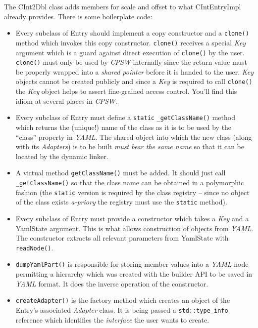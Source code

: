 \documentclass[10pt]{article}
\newcommand{\ita}[1]{\emph{#1}}
\newcommand{\cpsw}      {\ita {CPSW}}
\newcommand{\yaml}      {\ita {YAML}}
\newcommand{\cod}[1] {{\tt#1}}
\begin{document}
The CInt2Dbl class adds members for scale and offset to what CIntEntryImpl
already provides. There is some boilerplate code:
\begin{itemize}
\item Every subclass of Entry should implement a copy constructor and a \cod{clone()}
      method which invokes this copy constructor. \cod{clone()} receives a special
      {\em Key} argument which is a guard against direct execution of \cod{clone()}
      by the user. \cod{clone()} must only be used by \cpsw{} internally since the
      return value must be properly wrapped into a {\em shared pointer} before it
      is handed to the user. {\em Key} objects cannot be created publicly and since
      a {\em Key} is required to call \cod{clone()} the {\em Key} object helps to
      assert fine-grained access control. You'll find this idiom at several places
      in \cpsw{}.
\item Every subclass of Entry must define a \cod{static} \cod{\_getClassName()}
      method which returns the (unique!) name of the class as it is to be used
      by the ``class'' property in \yaml{}. The shared object into which the new
      class (along with its {\em Adapters}) is to be built {\em must bear the same name}
      so that it can be located by the dynamic linker.
\item A virtual method \cod{getClassName()} must be added. It should just 
      call \cod{\_getClassName()} so that the class name can be obtained in a polymorphic
      fashion (the \cod{static} version is required by the class registry -- since
      no object of the class exists {\em a-priory} the registry must use the
      \cod{static} method).
\item Every subclass of Entry must provide a constructor which takes a {\em Key}
      and a YamlState argument. This is what allows construction of objects from
      \yaml{}. The constructor extracts all relevant parameters from YamlState 
      with \cod{readNode()}.
\item \cod{dumpYamlPart()} is responsible for storing member values into a \yaml{}
      node permitting a hierarchy which was created with the builder API to be saved
      in \yaml{} format. It does the inverse operation of the constructor.
\item \cod{createAdapter()} is the factory method which creates an object of the
      Entry's associated {\em Adapter} class. It is being passed a \cod{std::type\_info}
      reference which identifies the {\em interface} the user wants to create.

\end{itemize}
\end{document}
